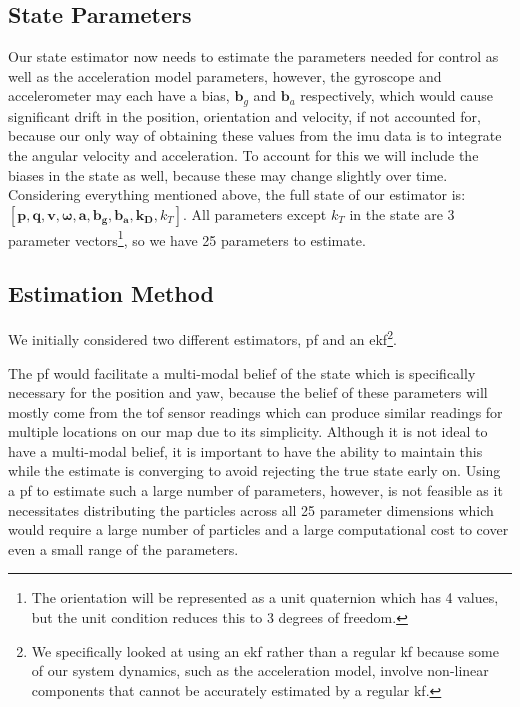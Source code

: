 \documentclass{report_template_oxford}
\begin{document}
\subsection{State Parameters}

Our state estimator now needs to estimate the parameters needed for control as well as the acceleration model parameters, however, the gyroscope and accelerometer may each have a bias, $\mathbf{b}_g$ and $\mathbf{b}_a$ respectively, which would cause significant drift in the position, orientation and velocity, if not accounted for, because our only way of obtaining these values from the \gls{imu} data is to integrate the angular velocity and acceleration. To account for this we will include the biases in the state as well, because these may change slightly over time. Considering everything mentioned above, the full state of our estimator is: $[\mathbf{p}, \mathbf{q}, \mathbf{v}, \boldsymbol{\omega}, \mathbf{a}, \mathbf{b_g}, \mathbf{b_a}, \mathbf{k_D}, k_{T}]$. All parameters except $k_{T}$ in the state are 3 parameter vectors\footnote{The orientation will be represented as a unit quaternion which has 4 values, but the unit condition reduces this to 3 degrees of freedom.}, so we have 25 parameters to estimate.

\subsection{Estimation Method}

We initially considered two different estimators, \gls{pf} and an \gls{ekf}\footnote{We specifically looked at using an \gls{ekf} rather than a regular \gls{kf} because some of our system dynamics, such as the acceleration model, involve non-linear components that cannot be accurately estimated by a regular \gls{kf}.}.

The \gls{pf} would facilitate a multi-modal belief of the state which is specifically necessary for the position and yaw, because the belief of these parameters will mostly come from the \gls{tof} sensor readings which can produce similar readings for multiple locations on our map due to its simplicity. Although it is not ideal to have a multi-modal belief, it is important to have the ability to maintain this while the estimate is converging to avoid rejecting the true state early on. Using a \gls{pf} to estimate such a large number of parameters, however, is not feasible as it necessitates distributing the particles across all 25 parameter dimensions which would require a large number of particles and a large computational cost to cover even a small range of the parameters. 
\end{document}
